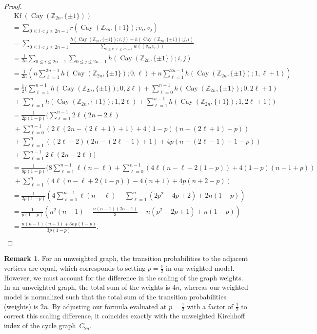 \documentclass[12pt, leqno]{amsart}
\numberwithin{equation}{section}
\theoremstyle{plain}
\theoremstyle{definition}
\newtheorem{rem}{Remark}[section]
\newcommand{\ZZ}{\mathbb{Z}}
\newcommand{\0}{\mathbf{0}}
\DeclareMathOperator{\Cay}{Cay}
\DeclareMathOperator{\Kf}{Kf}
\begin{document}
\begin{proof}

\begin{align*}
&\Kf(\Cay(\ZZ_{2n},\{\pm1\})) \\
&=\sum_{0\leq i<j\leq 2n-1}r(\Cay(\ZZ_{2n},\{\pm1\});v_i,v_j) \\
&=\sum_{0\leq i<j\leq 2n-1}\frac{h(\Cay(\ZZ_{2n},\{\pm1\});i,j)+h(\Cay(\ZZ_{2n},\{\pm1\});j,i)}{\sum_{0\leq k,\ell\leq 2n-1}w((v_k,v_\ell))} \\%
&=\frac{1}{2n}\sum_{0\leq i\leq 2n-1}\sum_{0\leq j\leq 2n-1}h(\Cay(\ZZ_{2n},\{\pm1\});i,j) \\
&=\frac{1}{2n}\left( n\sum_{\ell=1}^{2n-1}h(\Cay(\ZZ_{2n},\{\pm1\});0,\ell)
+n\sum_{\ell=1}^{2n-1}h(\Cay(\ZZ_{2n},\{\pm1\});1,\ell+1) \right) \\
&=\frac{1}{2}( \sum_{\ell=1}^{n-1}h(\Cay(\ZZ_{2n},\{\pm1\});0,2\ell)
+\sum_{\ell=0}^{n-1}h(\Cay(\ZZ_{2n},\{\pm1\});0,2\ell+1) \\
&~+\sum_{\ell=1}^nh(\Cay(\ZZ_{2n},\{\pm1\});1,2\ell)
+\sum_{\ell=1}^{n-1}h(\Cay(\ZZ_{2n},\{\pm1\});1,2\ell+1) ) \\
&=\frac{1}{2p(1-p)}( \sum_{\ell=1}^{n-1}2\ell(2n-2\ell) \\
&~+\sum_{\ell=0}^{n-1}(2\ell(2n-(2\ell+1)+1)+4(1-p)(n-(2\ell+1)+p)) \\
&~+\sum_{\ell=1}^n((2\ell-2)(2n-(2\ell-1)+1)+4p(n-(2\ell-1)+1-p)) \\
&~+\sum_{\ell=1}^{n-1}2\ell(2n-2\ell) ) \\
&=\frac{1}{8p(1-p)}( 8\sum_{\ell=1}^{n-1}\ell(n-\ell)
+\sum_{\ell=0}^{n-1}(4\ell(n-\ell-2(1-p))+4(1-p)(n-1+p)) \\
&~+\sum_{\ell=1}^n(4\ell(n-\ell+2(1-p))-4(n+1)+4p(n+2-p)) \\
%
&=\frac{1}{2p(1-p)}( 4\sum_{\ell=1}^{n-1}\ell(n-\ell)-\sum_{\ell=1}^n(2p^2-4p+2)+2n(1-p)) \\
&=\frac{1}{p(1-p)}( n^2(n-1)-\frac{n(n-1)(2n-1)}{3}-n(p^2-2p+1)+n(1-p)) \\
&=\frac{n(n-1)(n+1)+3np(1-p)}{3p(1-p)}. \\ %
\end{align*}
\end{proof}

\begin{rem}
For an unweighted graph, the transition probabilities to the adjacent vertices are equal, which corresponds to setting $p=\frac{1}{2}$ in our weighted model.
However, we must account for the difference in the scaling of the graph weights.
In an unweighted graph, the total sum of the weights is $4n$, whereas our weighted model is normalized such that the total sum of the transition probabilities (weights) is $2n$.
By adjusting our formula evaluated at $p=\frac{1}{2}$ with a factor of $\frac{1}{2}$ to correct this scaling difference, it coincides exactly with the unweighted Kirchhoff index of the cycle graph~$C_{2n}$.
\end{rem}
\end{document}
